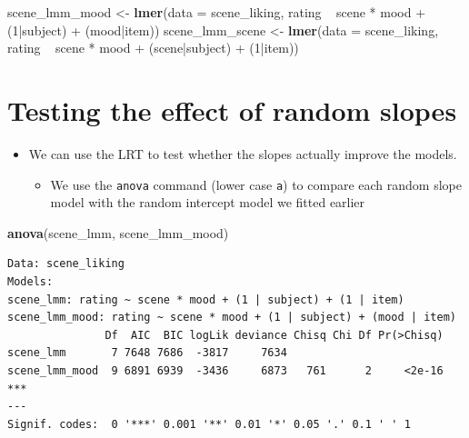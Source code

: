 \documentclass[]{article}
\newenvironment{Shaded}{}{}
\newcommand{\KeywordTok}[1]{\textcolor[rgb]{0.00,0.44,0.13}{\textbf{{#1}}}}
\newcommand{\DataTypeTok}[1]{\textcolor[rgb]{0.56,0.13,0.00}{{#1}}}
\newcommand{\DecValTok}[1]{\textcolor[rgb]{0.25,0.63,0.44}{{#1}}}
\newcommand{\StringTok}[1]{\textcolor[rgb]{0.25,0.44,0.63}{{#1}}}
\newcommand{\NormalTok}[1]{{#1}}
\begin{document}
\begin{Shaded}
\begin{Highlighting}[]
\NormalTok{scene_lmm_mood <-}\StringTok{ }\KeywordTok{lmer}\NormalTok{(}\DataTypeTok{data =} \NormalTok{scene_liking, rating ~}\StringTok{ }\NormalTok{scene *}\StringTok{ }\NormalTok{mood +}\StringTok{ }\NormalTok{(}\DecValTok{1}\NormalTok{|subject) +}\StringTok{ }\NormalTok{(mood|item))}
\NormalTok{scene_lmm_scene <-}\StringTok{ }\KeywordTok{lmer}\NormalTok{(}\DataTypeTok{data =} \NormalTok{scene_liking, rating ~}\StringTok{ }\NormalTok{scene *}\StringTok{ }\NormalTok{mood +}\StringTok{ }\NormalTok{(scene|subject) +}\StringTok{ }\NormalTok{(}\DecValTok{1}\NormalTok{|item))}
\end{Highlighting}
\end{Shaded}

\section{Testing the effect of random
slopes}\label{testing-the-effect-of-random-slopes}

\begin{itemize}
\itemsep1pt\parskip0pt
\item
  We can use the LRT to test whether the slopes actually improve the
  models.

  \begin{itemize}
  \itemsep1pt\parskip0pt
  \item
    We use the \texttt{anova} command (lower case \texttt{a}) to compare
    each random slope model with the random intercept model we fitted
    earlier
  \end{itemize}
\end{itemize}

\begin{Shaded}
\begin{Highlighting}[]
\KeywordTok{anova}\NormalTok{(scene_lmm, scene_lmm_mood)}
\end{Highlighting}
\end{Shaded}

\begin{verbatim}
Data: scene_liking
Models:
scene_lmm: rating ~ scene * mood + (1 | subject) + (1 | item)
scene_lmm_mood: rating ~ scene * mood + (1 | subject) + (mood | item)
               Df  AIC  BIC logLik deviance Chisq Chi Df Pr(>Chisq)    
scene_lmm       7 7648 7686  -3817     7634                            
scene_lmm_mood  9 6891 6939  -3436     6873   761      2     <2e-16 ***
---
Signif. codes:  0 '***' 0.001 '**' 0.01 '*' 0.05 '.' 0.1 ' ' 1
\end{verbatim}
\end{document}
